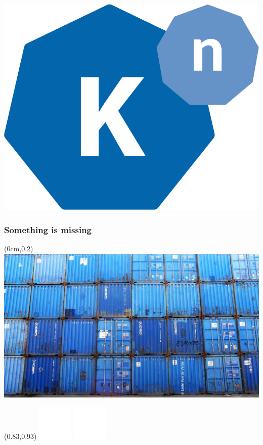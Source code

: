 \documentclass[aspectratio=169,11pt,hyperref={colorlinks=true}]{beamer}
\begin{document}
\begin{lblackrwhiteframe}
\begin{textblock*}{0.5\paperwidth}
    \includegraphics[width=0.20\paperwidth]{img/knative.png}
  \end{textblock*}
\end{lblackrwhiteframe}

\begin{blackframe}
  \frametitle{Something is missing}
  \begin{textblock*}{\paperwidth}(0cm,0.2\paperheight)
    \includegraphics[width=\paperwidth]{img/blue-containers.jpg}
  \end{textblock*}
  \begin{textblock*}{0.2\paperwidth}(0.83\paperwidth,0.93\paperheight)
    \includegraphics[width=0.03\paperwidth]{img/cc.png}
    \includegraphics[width=0.03\paperwidth]{img/zero.png}
  \end{textblock*}
\end{blackframe}
\end{document}
